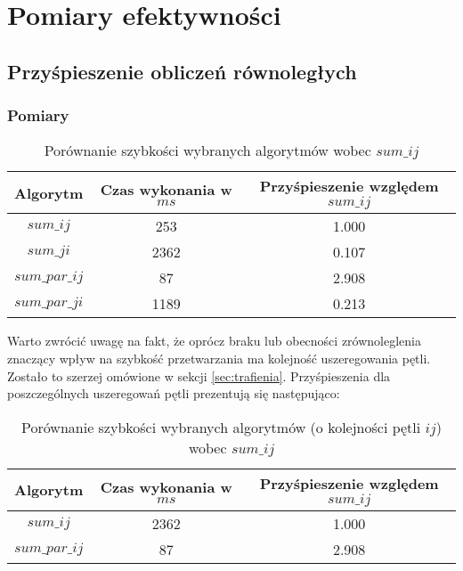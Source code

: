\section{Pomiary efektywności}

\subsection{Przyśpieszenie obliczeń równoległych}

\subsubsection{Pomiary}

\begin{table}[!ht]
\caption{Porównanie szybkości wybranych algorytmów wobec $sum\_ij$}
\begin{tabular}{|c|c|c|}

\hline
  Algorytm &
  Czas wykonania w $ms$ &
  Przyśpieszenie względem $sum\_ij$ \\

\hline
  $sum\_ij$ &
  253 &
  1.000 \\

\hline
  $sum\_ji$ &
  2362 &
  0.107 \\

\hline
  $sum\_par\_ij$ &
  87 &
  2.908 \\

\hline
  $sum\_par\_ji$ &
  1189 &
  0.213 \\

\hline

\end{tabular}
\end{table}

Warto zwrócić uwagę na fakt, że oprócz braku lub obecności zrównoleglenia znaczący wpływ na szybkość przetwarzania ma kolejność uszeregowania pętli. Zostało to szerzej omówione w sekcji \ref{sec:trafienia}. Przyśpieszenia dla poszczególnych uszeregowań pętli prezentują się następująco:

\begin{table}[!ht]
\caption{Porównanie szybkości wybranych algorytmów (o kolejności pętli $ij$) wobec $sum\_ij$}
\begin{tabular}{|c|c|c|}

\hline
  Algorytm &
  Czas wykonania w $ms$ &
  Przyśpieszenie względem $sum\_ij$ \\

\hline
  $sum\_ij$ &
  2362 &
  1.000 \\

\hline
  $sum\_par\_ij$ &
  87 &
  2.908 \\

\hline

\end{tabular}
\end{table}

